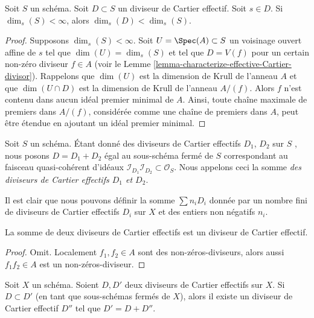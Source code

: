 \begin{lemma}
\label{lemma-effective-Cartier-makes-dimension-drop}
Soit  $S$  un schéma. Soit  $D \subset S$  un diviseur de Cartier effectif.
Soit  $s \in D$. Si  $\dim_s(S) < \infty$, alors  $\dim_s(D) < \dim_s(S)$.
\end{lemma}

\begin{proof}
Supposons  $\dim_s(S) < \infty$. Soit  $U = \Spec(A) \subset S$  un voisinage ouvert affine de
 $s$  tel que  $\dim(U) = \dim_s(S)$  et tel que  $D = V(f)$  pour un certain non-zéro
diviseur  $f \in A$  (voir le Lemme  \ref{lemma-characterize-effective-Cartier-divisor}). Rappelons que  $\dim(U)$  est
la dimension de Krull de l'anneau  $A$  et que  $\dim(U \cap D)$  est la
dimension de Krull de l'anneau  $A/(f)$. Alors  $f$  n'est contenu dans
aucun idéal premier minimal de  $A$. Ainsi, toute chaîne maximale de
premiers dans  $A/(f)$, considérée comme une chaîne de premiers dans
 $A$, peut être étendue en ajoutant un idéal premier minimal.
\end{proof}

\begin{definition}
\label{definition-sum-effective-Cartier-divisors}
Soit  $S$  un schéma. Étant donné des diviseurs de Cartier effectifs
 $D_1$,  $D_2$  sur  $S$ , nous posons  $D = D_1 + D_2$  égal au
sous-schéma fermé de  $S$  correspondant au faisceau quasi-cohérent
d'idéaux  $\mathcal{I}_{D_1}\mathcal{I}_{D_2} \subset \mathcal{O}_S$. Nous appelons ceci la somme  {\it  des
diviseurs de Cartier effectifs  $D_1$  et  $D_2$}.
\end{definition}

\noindent
Il est clair que nous pouvons définir la somme  $\sum n_iD_i$  donnée par un nombre
fini de diviseurs de Cartier effectifs  $D_i$  sur  $X$  et des
entiers non négatifs  $n_i$.

\begin{lemma}
\label{lemma-sum-effective-Cartier-divisors}
La somme de deux diviseurs de Cartier effectifs est un diviseur de Cartier
effectif.
\end{lemma}

\begin{proof}
Omit. Localement  $f_1, f_2 \in A$  sont des non-zéros-diviseurs, alors aussi
 $f_1f_2 \in A$  est un non-zéros-diviseur.
\end{proof}

\begin{lemma}
\label{lemma-difference-effective-Cartier-divisors}
Soit  $X$  un schéma. Soient  $D, D'$  deux diviseurs de Cartier
effectifs sur  $X$. Si  $D \subset D'$  (en tant que sous-schémas fermés de
 $X$), alors il existe un diviseur de Cartier effectif  $D''$  tel
que  $D' = D + D''$.
\end{lemma}

